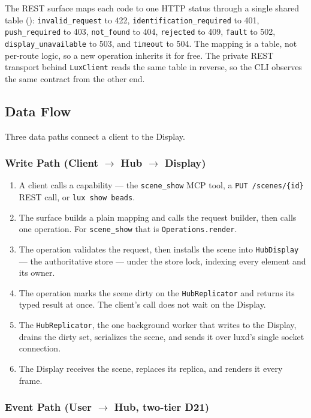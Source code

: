 \documentclass[a4paper,10pt]{article}
\newcommand{\modpath}[1]{\path{src/punt_lux/#1}}
\newcommand{\tool}[1]{\texttt{#1}}
\begin{document}
The REST surface maps each code to one HTTP status through a single shared
table (\modpath{rest/status.py}): \texttt{invalid\_request} to 422,
\texttt{identification\_required} to 401, \texttt{push\_required} to 403,
\texttt{not\_found} to 404, \texttt{rejected} to 409, \texttt{fault} to
502, \texttt{display\_unavailable} to 503, and \texttt{timeout} to 504.
The mapping is a table, not per-route logic, so a new operation inherits it
for free. The private REST transport behind \texttt{LuxClient} reads the
same table in reverse, so the
CLI observes the same contract from the other end.

\subsection{Data Flow}

Three data paths connect a client to the Display.

\subsubsection{Write Path (Client $\to$ Hub $\to$ Display)}

\begin{enumerate}
  \item A client calls a capability --- the \tool{scene\_show} MCP tool, a
    \texttt{PUT /scenes/\{id\}} REST call, or \tool{lux show beads}.
  \item The surface builds a plain mapping and calls the request builder,
    then calls one operation.  For \tool{scene\_show} that is
    \texttt{Operations.render}.
  \item The operation validates the request, then installs the scene into
    \texttt{HubDisplay} --- the authoritative store --- under the store
    lock, indexing every element and its owner.
  \item The operation marks the scene dirty on the \texttt{HubReplicator}
    and returns its typed result at once.  The client's call does not wait
    on the Display.
  \item The \texttt{HubReplicator}, the one background worker that writes
    to the Display, drains the dirty set, serializes the scene, and sends
    it over luxd's single socket connection.
  \item The Display receives the scene, replaces its replica, and renders
    it every frame.
\end{enumerate}

\subsubsection{Event Path (User $\to$ Hub, two-tier D21)}
\end{document}
